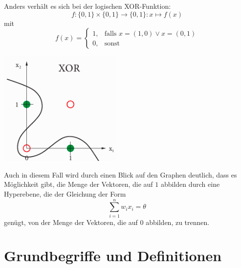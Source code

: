 \documentclass[fontsize=11pt]{scrartcl}
\newenvironment{Figure}
  {\par\medskip\noindent\minipage{\linewidth}}
  {\endminipage\par\medskip}
\begin{document}
                        \newline
                        Anders verhält es sich bei der logischen XOR-Funktion:
                        $$
                            f:\{0,1\}\times\{0,1\}\rightarrow\{0,1\}: x\mapsto f(x)
                        $$
                        mit
                        $$
                            f(x)=\left\{\begin{array}{cl} 1, & \mbox{falls }x=(1,0) \vee x = (0,1)\\
                            0, & \mbox{sonst}\end{array}\right. 
                        $$
                        \begin{Figure}
                            \centering
                            \includegraphics[scale=0.5]{XOR.png}
                        \end{Figure}
                        Auch in diesem Fall wird durch einen Blick auf den Graphen deutlich, dass es Möglichkeit gibt, die Menge der Vektoren, die auf $1$ abbilden durch eine Hyperebene, die der Gleichung der Form
                        $$
                            \sum_{i=1}^nw_ix_i = \theta
                        $$
                        genügt, von der Menge der Vektoren, die auf $0$ abbilden, zu trennen.
                        
        \section{Grundbegriffe und Definitionen}
\end{document}
